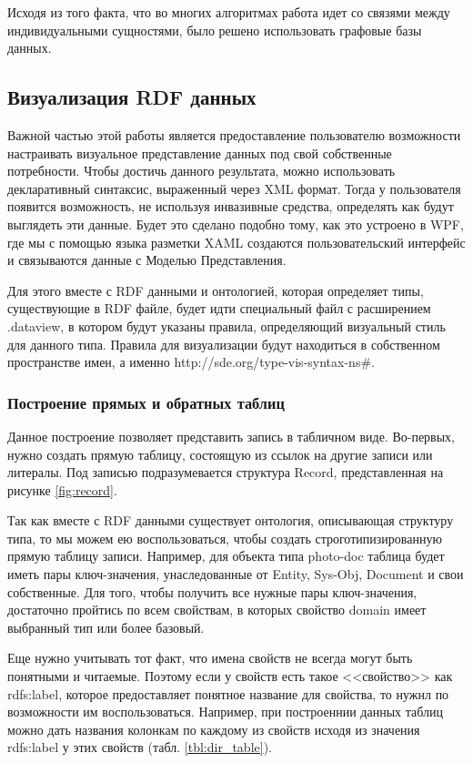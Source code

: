 \documentclass[12pt]{article}
\begin{document}
Исходя из того факта, что во многих алгоритмах работа идет со связями между индивидуальными сущностями, было решено использовать графовые базы данных.

\subsection{Визуализация RDF данных} \label{sect:Rdf_Vis}
\qquad Важной частью этой работы является предоставление пользователю возможности настраивать визуальное представление данных под свой собственные потребности. Чтобы достичь данного результата, можно использовать декларативный синтаксис, выраженный через XML формат. Тогда у пользователя появится возможность, не используя инвазивные средства, определять как будут выглядеть эти данные. Будет это сделано подобно тому, как это устроено в WPF, где мы с помощью языка разметки XAML создаются пользовательский интерфейс и связываются данные с Моделью Представления.

Для этого вместе с RDF данными и онтологией, которая определяет типы, существующие в RDF файле, будет идти специальный файл с расширением .dataview, в котором будут указаны правила, определяющий визуальный стиль для данного типа. Правила для визуализации будут находиться в собственном пространстве имен, а именно http://sde.org/type-vis-syntax-ns\#.

\subsubsection{Построение прямых и обратных таблиц} \label{sect:tables}
\qquad Данное построение позволяет представить запись в табличном виде. Во-первых, нужно создать прямую таблицу, состоящую из ссылок на другие записи или литералы. Под записью подразумевается структура Record, представленная на рисунке \ref{fig:record}.

Так как вместе с RDF данными существует онтология, описывающая структуру типа, то мы можем ею воспользоваться, чтобы создать строготипизированную прямую таблицу записи. Например, для объекта типа photo-doc таблица будет иметь пары ключ-значения, унаследованные от Entity, Sys-Obj, Document и свои собственные. Для того, чтобы получить все нужные пары ключ-значения, достаточно пройтись по всем свойствам, в которых свойство domain имеет выбранный тип или более базовый.

Еще нужно учитывать тот факт, что имена свойств не всегда могут быть понятными и читаемые. Поэтому если у свойств есть такое <<свойство>> как rdfs:label, которое предоставляет понятное название для свойства, то нужнл по возможности им воспользоваться. Например, при построеннии данных таблиц можно дать названия колонкам по каждому из свойств исходя из значения rdfs:label у этих свойств (табл. \ref{tbl:dir_table}).
\end{document}
